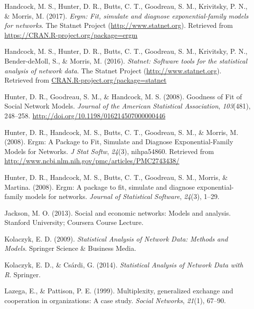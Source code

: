 \documentclass[12pt,twoside]{amherstthesis}
\begin{document}
  \hypertarget{ref-ergmpackagemanual}{}
  Handcock, M. S., Hunter, D. R., Butts, C. T., Goodreau, S. M.,
  Krivitsky, P. N., \& Morris, M. (2017). \emph{Ergm: Fit, simulate and
  diagnose exponential-family models for networks}. The Statnet Project
  (\url{http://www.statnet.org}). Retrieved from
  \url{https://CRAN.R-project.org/package=ergm}
  
  \hypertarget{ref-statnetpackagemanual}{}
  Handcock, M. S., Hunter, D. R., Butts, C. T., Goodreau, S. M.,
  Krivitsky, P. N., Bender-deMoll, S., \& Morris, M. (2016).
  \emph{Statnet: Software tools for the statistical analysis of network
  data}. The Statnet Project (\url{http://www.statnet.org}). Retrieved
  from \url{CRAN.R-project.org/package=statnet}
  
  \hypertarget{ref-hunter_goodness_2008}{}
  Hunter, D. R., Goodreau, S. M., \& Handcock, M. S. (2008). Goodness of
  Fit of Social Network Models. \emph{Journal of the American Statistical
  Association}, \emph{103}(481), 248--258.
  \url{http://doi.org/10.1198/016214507000000446}
  
  \hypertarget{ref-hunter_ergm:_2008}{}
  Hunter, D. R., Handcock, M. S., Butts, C. T., Goodreau, S. M., \&
  Morris, M. (2008). Ergm: A Package to Fit, Simulate and Diagnose
  Exponential-Family Models for Networks. \emph{J Stat Softw},
  \emph{24}(3), nihpa54860. Retrieved from
  \url{http://www.ncbi.nlm.nih.gov/pmc/articles/PMC2743438/}
  
  \hypertarget{ref-ergmpackagearticle}{}
  Hunter, D. R., Handcock, M. S., Butts, C. T., Goodreau, S. M., Morris,
  \& Martina. (2008). Ergm: A package to fit, simulate and diagnose
  exponential-family models for networks. \emph{Journal of Statistical
  Software}, \emph{24}(3), 1--29.
  
  \hypertarget{ref-jacksonergms2013}{}
  Jackson, M. O. (2013). Social and economic networks: Models and
  analysis. Stanford University; Coursera Course Lecture.
  
  \hypertarget{ref-kolaczyk_statistical_2009}{}
  Kolaczyk, E. D. (2009). \emph{Statistical Analysis of Network Data:
  Methods and Models}. Springer Science \& Business Media.
  
  \hypertarget{ref-kolaczyk_statistical_2014}{}
  Kolaczyk, E. D., \& Csárdi, G. (2014). \emph{Statistical Analysis of
  Network Data with R}. Springer.
  
  \hypertarget{ref-lazega1999multiplexity}{}
  Lazega, E., \& Pattison, P. E. (1999). Multiplexity, generalized
  exchange and cooperation in organizations: A case study. \emph{Social
  Networks}, \emph{21}(1), 67--90.
  
\end{document}
